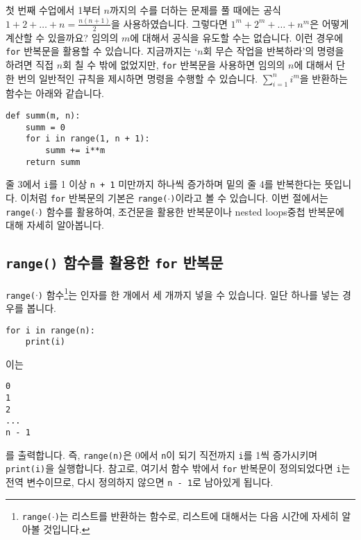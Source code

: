 \documentclass[../main.tex]{subfiles}
\begin{document}
첫 번째 수업에서 1부터 $n$까지의 수를 더하는 문제를 풀 때에는 공식
$1 + 2 + \dots + n = \frac{n(n + 1)}{2}$을 사용하였습니다.
그렇다면 $1^m + 2^m + \dots + n^m$은 어떻게 계산할 수 있을까요?
임의의 $m$에 대해서 공식을 유도할 수는 없습니다.
이런 경우에 \texttt{for} 반복문을 활용할 수 있습니다.
지금까지는 `$n$회 무슨 작업을 반복하라'의 명령을 하려면 직접 $n$회 칠 수 밖에 없었지만,  \texttt{for} 반복문을 사용하면 임의의 $n$에 대해서 단 한 번의 일반적인 규칙을 제시하면 명령을 수행할 수 있습니다.
$\sum_{i = 1}^n i^m$을 반환하는 함수는 아래와 같습니다.
\begin{verbatim}
def summ(m, n):
    summ = 0
    for i in range(1, n + 1):
        summ += i**m
    return summ
\end{verbatim}
줄 3에서 \texttt{i}를 1 이상 \texttt{n + 1} 미만까지 하나씩 증가하며 밑의 줄 4를 반복한다는 뜻입니다.
이처럼 \texttt{for} 반복문의 기본은 \texttt{range($\cdot$)}이라고 볼 수 있습니다.
이번 절에서는 \texttt{range($\cdot$)} 함수를 활용하여, 조건문을 활용한 반복문이나 nested loops중첩 반복문에 대해 자세히 알아봅니다.

\subsection{\texttt{range()} 함수를 활용한 \texttt{for} 반복문}
\texttt{range($\cdot$)} 함수\footnote{\texttt{range($\cdot$)}는 리스트를 반환하는 함수로, 리스트에 대해서는 다음 시간에 자세히 알아볼 것입니다.}는 인자를 한 개에서 세 개까지 넣을 수 있습니다.
일단 하나를 넣는 경우를 봅니다.
\begin{verbatim}
for i in range(n):
    print(i)
\end{verbatim}
이는 
\begin{verbatim}
0
1
2
...
n - 1
\end{verbatim}
를 출력합니다.
즉, \texttt{range(n)}은 0에서 \texttt{n}이 되기 직전까지 \texttt{i}를 1씩
증가시키며 \texttt{print(i)}을 실행합니다.
참고로, 여기서 함수 밖에서 \texttt{for} 반복문이 정의되었다면 \texttt{i}는 전역 변수이므로, 다시 정의하지 않으면 \texttt{n - 1}로 남아있게 됩니다.
\end{document}
